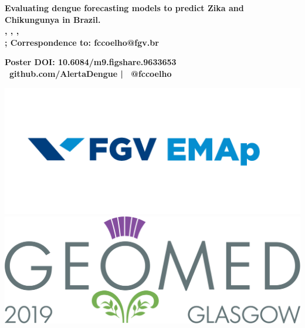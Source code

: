\documentclass[a0,portrait]{a0poster}
\begin{document}


\begin{minipage}[b]{0.75\linewidth}
\VeryHuge \color{NavyBlue} \textbf{Evaluating dengue forecasting models to 
predict Zika and Chikungunya in Brazil.}
\color{Black}\\[0.4cm] 
\Large \textbf{
, 
, 
, 
} 
\\
\vspace{1cm}
\large \textbf{
; 
\large \textbf{Correspondence to: fccoelho@fgv.br}}
\begin{center}
    \large \textbf{Poster DOI: 10.6084/m9.figshare.9633653 \\ \faGithub \ 
github.com/AlertaDengue | \faTwitter \ @fccoelho}
\end{center}
\end{minipage}
%
\begin{minipage}[b]{0.25\linewidth}
\begin{center}
\includegraphics[width=15cm]{figures/Marca_FGV_EMAp.png}\\ 
\includegraphics[width=16cm]{figures/geomed.png}\\
\end{center}
\end{minipage}
\end{document}
